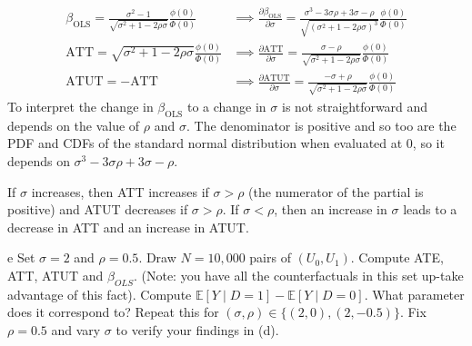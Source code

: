 \documentclass{article}
\begin{document}
\begin{solution}
\begin{align*}
    \beta_\text{OLS} =  \frac{\sigma^2-1}{\sqrt{\sigma^2+1-2\rho\sigma}} \frac{\phi(0)}{\Phi(0)} &\implies \frac{\partial \beta_\text{OLS}}{\partial \sigma} = \frac{\sigma^3-3\sigma\rho+3\sigma-\rho}{\sqrt{(\sigma^2+1-2\rho\sigma)^3}} \frac{\phi(0)}{\Phi(0)} 
    \\
    \text{ATT} = \sqrt{\sigma^2 + 1 - 2\rho\sigma} \frac{\phi(0)}{\Phi(0)} &\implies \frac{\partial \text{ATT}}{\partial \sigma} = \frac{\sigma-\rho}{\sqrt{\sigma^2 + 1 - 2\rho\sigma}} \frac{\phi(0)}{\Phi(0)} \\
    \text{ATUT} = -\text{ATT} &\implies \frac{\partial \text{ATUT}}{\partial \sigma} = \frac{-\sigma+\rho}{\sqrt{\sigma^2 + 1 - 2\rho\sigma}} \frac{\phi(0)}{\Phi(0)}
\end{align*}
To interpret the change in $\beta_\text{OLS}$ to a change in $\sigma$ is not straightforward and depends on the value of $\rho$ and $\sigma$. The denominator is positive and so too are the PDF and CDFs of the standard normal distribution when evaluated at 0, so it depends on $\sigma^3-3\sigma\rho+3\sigma-\rho$.

If $\sigma$ increases, then ATT increases if $\sigma>\rho$ (the numerator of the partial is positive) and ATUT decreases if $\sigma>\rho$. If $\sigma<\rho$, then an increase in $\sigma$ leads to a decrease in ATT and an increase in ATUT.


\end{solution}
\begin{problem}{e}
Set $\sigma=2$ and $\rho=0.5$. Draw $N=10,000$ pairs of $\left(U_{0}, U_{1}\right)$. Compute ATE, ATT, ATUT and $\beta_{O L S}$. (Note: you have all the counterfactuals in this set up-take advantage of this fact). Compute $\mathbb{E}[Y \mid D=1]-\mathbb{E}[Y \mid D=0]$. What parameter does it correspond to? Repeat this for $(\sigma, \rho) \in\{(2,0),(2,-0.5)\}$. Fix $\rho=0.5$ and vary $\sigma$ to verify your findings in (d).
\end{problem}
\end{document}
